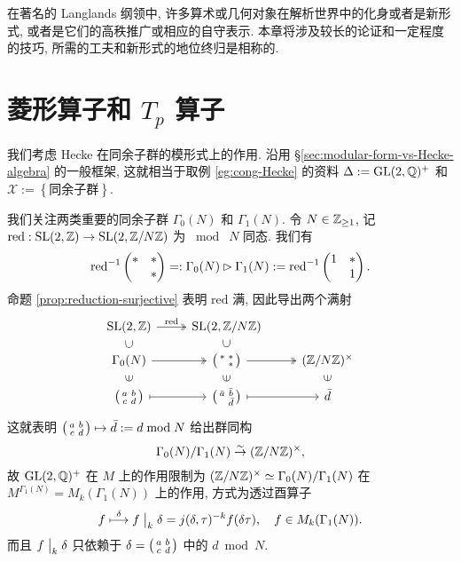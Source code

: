 在著名的 Langlands 纲领中, 许多算术或几何对象在解析世界中的化身或者是新形式, 或者是它们的高秩推广或相应的自守表示. 本章将涉及较长的论证和一定程度的技巧, 所需的工夫和新形式的地位终归是相称的.

\section{菱形算子和 \texorpdfstring{$T_p$}{Tp} 算子}\label{sec:diamond-operators}
我们考虑 Hecke 在同余子群的模形式上的作用. 沿用 \S\ref{sec:modular-form-vs-Hecke-algebra} 的一般框架, 这就相当于取例 \ref{eg:cong-Hecke} 的资料 $\Delta := \operatorname{GL}(2, \mathbb{Q})^+$ 和 $\mathcal{X} := \left\{\text{同余子群} \right\}$.

我们关注两类重要的同余子群 $\Gamma_0(N)$ 和 $\Gamma_1(N)$. 令 $N \in \mathbb{Z}_{\geq 1}$, 记 $\text{red}: \operatorname{SL}(2,\mathbb{Z}) \to \operatorname{SL}(2, \mathbb{Z}/N\mathbb{Z})$ 为 $\bmod\; N$ 同态. 我们有
\[ \text{red}^{-1}\begin{pmatrix} * & * \\  & * \end{pmatrix} =: \Gamma_0(N) \rhd \Gamma_1(N) := \text{red}^{-1}\begin{pmatrix} 1 & * \\  & 1 \end{pmatrix}. \]
命题 \ref{prop:reduction-surjective} 表明 $\text{red}$ 满, 因此导出两个满射
\[\begin{tikzcd}[row sep=small]
	\SL(2,\Z) \arrow[twoheadrightarrow, r, "\text{red}"] & \SL(2, \Z/N\Z) & \\
	\Gamma_0(N) \arrow[phantom, u, "\subset" description, sloped] \arrow[twoheadrightarrow, r] & \twomatrix{*}{*}{}{*} \arrow[phantom, u, "\subset" description, sloped] \arrow[twoheadrightarrow, r] & (\Z/N\Z)^\times \\
	\twomatrix{a}{b}{c}{d} \arrow[mapsto, r] \arrow[phantom, u, "\in" description, sloped] & \twomatrix{\bar{a}}{\bar{b}}{}{\bar{d}} \arrow[phantom, u, "\in" description, sloped] \arrow[mapsto, r] & \bar{d} \arrow[phantom, u, "\in" description, sloped]
\end{tikzcd}\]
这就表明 $\bigl(\begin{smallmatrix} a & b \\ c & d \end{smallmatrix}\bigr) \mapsto \bar{d} := d \bmod N$ 给出群同构
\[ \Gamma_0(N)/\Gamma_1(N) \stackrel{\sim}{\rightarrow} (\mathbb{Z}/N\mathbb{Z})^\times, \]
故 $\operatorname{GL}(2,\mathbb{Q})^+$ 在 $M$ 上的作用限制为 $(\mathbb{Z}/N\mathbb{Z})^\times \simeq \Gamma_0(N)/\Gamma_1(N)$ 在 $M^{\Gamma_1(N)} = M_k(\Gamma_1(N))$ 上的作用, 方式为透过酉算子
\[ f \stackrel{\delta}{\longmapsto} f \;\big|_{k} \; \delta = j(\delta,\tau)^{-k} f(\delta\tau), \quad f \in M_k(\Gamma_1(N)). \]
而且 $f \;\big|_{k} \;\delta$ 只依赖于 $\delta = \bigl(\begin{smallmatrix} a & b \\ c & d \end{smallmatrix}\bigr)$ 中的 $d \bmod N$.

